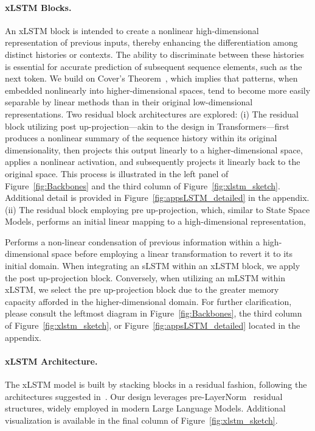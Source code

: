 \paragraph{xLSTM Blocks.}
\label{sec:xLSTMblock}
An xLSTM block is intended to create a nonlinear high-dimensional representation of previous inputs, thereby enhancing the differentiation among distinct histories or contexts. The ability to discriminate between these histories is essential for accurate prediction of subsequent sequence elements, such as the next token. We build on Cover’s Theorem~\citep{Cover:65}, which implies that patterns, when embedded nonlinearly into higher-dimensional spaces, tend to become more easily separable by linear methods than in their original low-dimensional representations. Two residual block architectures are explored: (i) The residual block utilizing post up-projection—akin to the design in Transformers—first produces a nonlinear summary of the sequence history within its original dimensionality, then projects this output linearly to a higher-dimensional space, applies a nonlinear activation, and subsequently projects it linearly back to the original space. This process is illustrated in the left panel of Figure~\ref{fig:Backbones} and the third column of Figure~\ref{fig:xlstm_sketch}. Additional detail is provided in Figure~\ref{fig:appsLSTM_detailed} in the appendix. (ii) The residual block employing pre up-projection, which, similar to State Space Models, performs an initial linear mapping to a high-dimensional representation,

Performs a non-linear condensation of previous information within a high-dimensional space before employing a linear transformation to revert it to its initial domain. When integrating an sLSTM within an xLSTM block, we apply the post up-projection block. Conversely, when utilizing an mLSTM within xLSTM, we select the pre up-projection block due to the greater memory capacity afforded in the higher-dimensional domain. For further clarification, please consult the leftmost diagram in Figure~\ref{fig:Backbones}, the third column of Figure~\ref{fig:xlstm_sketch}, or Figure~\ref{fig:appsLSTM_detailed} located in the appendix.

\paragraph{xLSTM Architecture. }
\label{sec:xLSTMarchitecure}
The xLSTM model is built by stacking blocks in a residual fashion, following the architectures suggested in~\citep{Srivastava:15,He:16}. Our design leverages pre-LayerNorm~\citep{Ba:16b} residual structures, widely employed in modern Large Language Models. Additional visualization is available in the final column of Figure~\ref{fig:xlstm_sketch}.

